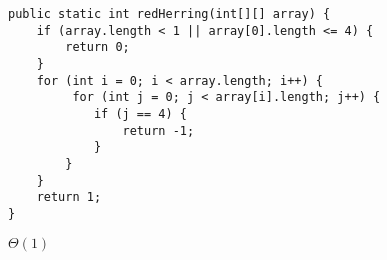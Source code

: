 \question
\begin{lstlisting}
public static int redHerring(int[][] array) {
    if (array.length < 1 || array[0].length <= 4) {
        return 0;
    }
    for (int i = 0; i < array.length; i++) {
         for (int j = 0; j < array[i].length; j++) {
            if (j == 4) {
                return -1;
            }
        }
    }
    return 1;
}
\end{lstlisting}

\begin{solution}[0.25in]
$\Theta(1)$
\end{solution}